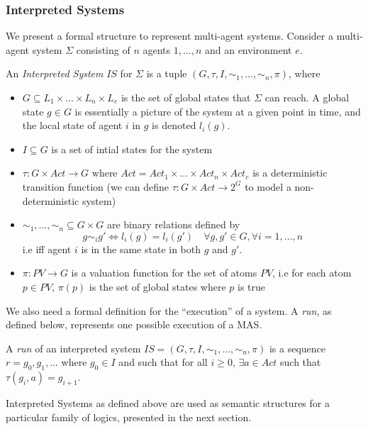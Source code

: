 \documentclass[12]{article}
\newenvironment{definition}[1][Definition]{\begin{trivlist}
\item[\hskip \labelsep {\bfseries #1}]}{\end{trivlist}}
\begin{document}
\subsubsection{Interpreted Systems}
\label{IS}
We present a formal structure to represent multi-agent systems. Consider a multi-agent system $\Sigma$ consisting of $n$ agents $1, ..., n$ and an environment $e$.
\begin{definition}
An \textit{Interpreted System} $IS$ for $\Sigma$ is a tuple $(G, \tau, I, \sim_1, ..., \sim_n, \pi)$, where
\begin{itemize}
\item $G \subseteq L_1 \times ... \times L_n \times L_e$ is the set of global states that $\Sigma$ can reach. A global state $g \in G$ is essentially a picture of the system at a given point in time, and the local state of agent $i$ in $g$ is denoted $l_i(g)$.
\item $I \subseteq G$ is a set of intial states for the system
\item $\tau : G \times Act \rightarrow G $ where $Act = Act_1 \times ... \times Act_n \times Act_e$ is a deterministic transition function (we can define $\tau : G \times Act \rightarrow 2^G$ to model a non-deterministic system)
\item $\sim_1, ..., \sim_n \subseteq G \times G$  are binary relations defined by $$g \sim_i g' \Leftrightarrow l_i(g) = l_i(g') \quad \forall g, g' \in G, \forall i = 1, ..., n$$
i.e iff agent $i$ is in the same state in both $g$ and $g'$. 
\item $\pi : PV \rightarrow G$ is a valuation function for the set of atoms $PV$, i.e for each atom $p \in PV$, $\pi(p)$ is the set of global states where $p$ is true
\end{itemize}
\end{definition}

We also need a formal definition for the ``execution'' of a system. A \emph{run}, as defined below, represents one possible execution of a MAS. 
\begin{definition} 
A \emph{run} of an interpreted system $IS = (G, \tau, I, \sim_1, ..., \sim_n, \pi)$ is a sequence $r = g_0, g_1, ...$ where $g_0 \in I$ and such that for all $i \geq 0$, $\exists a \in Act$ such that $\tau(g_i, a) = g_{i+1}$.
\end{definition}

Interpreted Systems as defined above are used as semantic structures for a particular family of logics, presented in the next section.
\end{document}
